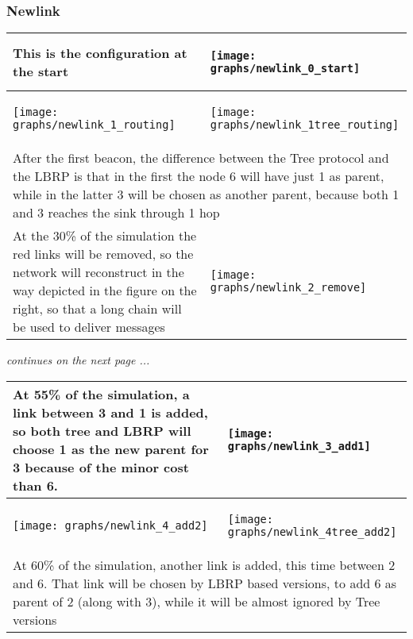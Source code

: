 \documentclass{article}
\begin{document}
\subsubsection{Newlink}
	\bigskip
	\bigskip
	\begin{table}[H]
		\centering
		\begin{tabular}{*{2}{m{}}}
			\hline
			\small This is the configuration at the start&\begin{center}\texttt{[image: graphs/newlink\_0\_start]}\end{center}\\
			\hline
			\begin{center}\texttt{[image: graphs/newlink\_1\_routing]}\end{center}&\begin{center}\texttt{[image: graphs/newlink\_1tree\_routing]}\end{center}\\
			\multicolumn{2}{p{12cm}}{\small After the first beacon, the difference between the Tree protocol and the LBRP is that in the first the node 6 will have just 1 as parent, while in the latter 3 will be chosen as another parent, because both 1 and 3 reaches the sink through 1 hop}\\
			\hline
			\small At the 30\% of the simulation the red links will be removed, so the network will reconstruct in the way depicted in the figure on the right, so that a long chain will be used to deliver messages&\begin{center}\texttt{[image: graphs/newlink\_2\_remove]}\end{center}\\
			\hline
		\end{tabular}
		\label{tab:newlinkIndepthP1}
	\end{table}
	\begin{center}
	\small \textit{continues on the next page ...}
	\end{center}
	\clearpage
	\begin{table}[H]
		\centering
		\begin{tabular}{*{2}{m{}}}
			\hline
			\small At 55\% of the simulation, a link between 3 and 1 is added, so both tree and LBRP will choose 1 as the new parent for 3 because of the minor cost than 6.&\begin{center}\texttt{[image: graphs/newlink\_3\_add1]}\end{center}\\
			\hline
			\begin{center}\texttt{[image: graphs/newlink\_4\_add2]}\end{center}&\begin{center}\texttt{[image: graphs/newlink\_4tree\_add2]}\end{center}\\
			\multicolumn{2}{p{12cm}}{\small At 60\% of the simulation, another link is added, this time between 2 and 6. That link will be chosen by LBRP based versions, to add 6 as parent of 2 (along with 3), while it will be almost ignored by Tree versions}\\
			\hline
		\end{tabular}
		\label{tab:newlinkIndepthP2}
	\end{table}
\end{document}
